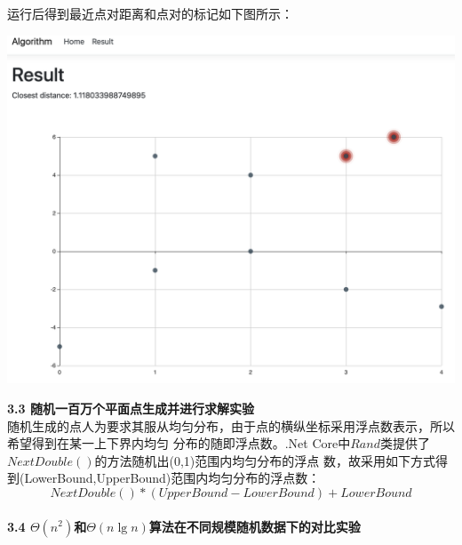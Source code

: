 \documentclass[a4paper]{article}
\begin{document}
\begin{enumerate}
  运行后得到最近点对距离和点对的标记如下图所示：
  \bigskip
  \begin{center}
    \includegraphics[scale=0.3]{Pictures/cpop2.png}
  \end{center}
  \medskip
  \textbf{3.3 随机一百万个平面点生成并进行求解实验}\\
  随机生成的点人为要求其服从均匀分布，由于点的横纵坐标采用浮点数表示，所以希望得到在某一上下界内均匀
  分布的随即浮点数。.Net Core中$Rand$类提供了$NextDouble()$的方法随机出(0,1)范围内均匀分布的浮点
  数，故采用如下方式得到(LowerBound,UpperBound)范围内均匀分布的浮点数：
  $$NextDouble()*(UpperBound-LowerBound)+LowerBound$$\\
  \medskip
  \textbf{3.4 $\Theta(n^2)$和$\Theta(n\lg n)$算法在不同规模随机数据下的对比实验}
  \\
\end{enumerate}
\end{document}
